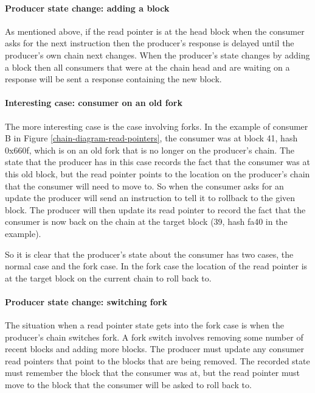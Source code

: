 \documentclass{article}
\theoremstyle{definition}{
  \newtheorem{lemma}{Lemma}[section] %
  \newtheorem{definition}[lemma]{Definition}
}
\theoremstyle{theorem}{
  \newtheorem{invariant}[lemma]{Invariant}
  \newtheorem{proofobligation}[lemma]{Proof Obligation}
}
\numberwithin{equation}{lemma}
\begin{document}
\paragraph{Producer state change: adding a block}

As mentioned above, if the read pointer is at the head block when the consumer
asks for the next instruction then the producer's response is delayed until
the producer's own chain next changes. When the producer's state changes by
adding a block then all consumers that were at the chain head and are waiting
on a response will be sent a response containing the new block.

\paragraph{Interesting case: consumer on an old fork}
The more interesting case is the case involving forks. In the example of
consumer B in Figure \ref{chain-diagram-read-pointers}, the consumer was at
block 41, hash 0x660f, which is on an old fork that is no longer on the
producer's chain. The state that the producer has in this case records the fact
that the consumer was at this old block, but the read pointer points to the
location on the producer's chain that the consumer will need to move to. So
when the consumer asks for an update the producer will send an instruction to
tell it to rollback to the given block. The producer will then update its read
pointer to record the fact that the consumer is now back on the chain at the
target block (39, hash fa40 in the example).

So it is clear that the producer's state about the consumer has two cases, the
normal case and the fork case. In the fork case the location of the read
pointer is at the target block on the current chain to roll back to.

\paragraph{Producer state change: switching fork}

The situation when a read pointer state gets into the fork case is when the
producer's chain switches fork. A fork switch involves removing some number
of recent blocks and adding more blocks. The producer must update any consumer
read pointers that point to the blocks that are being removed. The recorded
state must remember the block that the consumer was at, but the read pointer
must move to the block that the consumer will be asked to roll back to.
\end{document}
